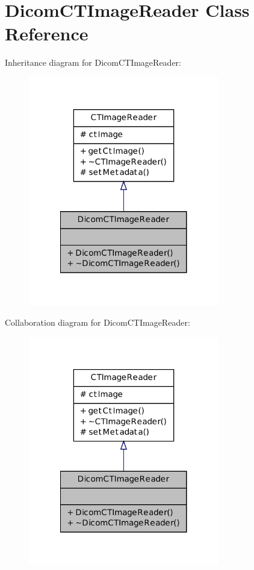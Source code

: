 \hypertarget{class_dicom_c_t_image_reader}{
\section{DicomCTImageReader Class Reference}
\label{class_dicom_c_t_image_reader}
}


Inheritance diagram for DicomCTImageReader:
\nopagebreak
\begin{figure}[H]
\begin{center}
\leavevmode
\includegraphics[width=236pt]{class_dicom_c_t_image_reader__inherit__graph}
\end{center}
\end{figure}


Collaboration diagram for DicomCTImageReader:
\nopagebreak
\begin{figure}[H]
\begin{center}
\leavevmode
\includegraphics[width=236pt]{class_dicom_c_t_image_reader__coll__graph}
\end{center}
\end{figure}
